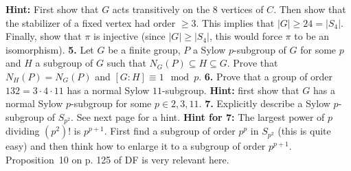 \documentclass[12pt]{amsart}
\begin{document}
{\bf Hint: } First show that $G$ acts transitively on the 8 vertices of $C$. Then show that the stabilizer of a fixed vertex had order $\geq 3$. This implies that $|G|\geq 24=|S_4|$. Finally, show that $\pi$ is injective (since $|G|\geq |S_4|$, this would force $\pi$ to be an isomorphism).
\skv
{\bf 5.} Let $G$ be a finite group, $P$ a Sylow $p$-subgroup of $G$ for some $p$
and $H$ a subgroup of $G$ such that $N_{G}(P)\subseteq H\subseteq G$.
Prove that $N_H(P)=N_G(P)$ and $[G:H]\equiv 1\mod p$.
\skv
{\bf 6.} Prove that a group of order $132=3\cdot 4\cdot 11$ has a normal Sylow $11$-subgroup. {\bf Hint:} first show that
$G$ has a normal Sylow $p$-subgroup for some $p\in {2,3,11}$.
\skv
{\bf 7.} Explicitly describe a Sylow $p$-subgroup of $S_{p^2}$. See next page for a hint.
\newpage
{\bf Hint for 7:} The largest power of $p$ dividing $(p^2)!$ is $p^{p+1}$. First find a subgroup of order $p^p$
in $S_{p^2}$ (this is quite easy) and then think how to enlarge it to a subgroup of order $p^{p+1}$. Proposition~10 on p. 125 of DF
is very relevant here.
\end{document}
